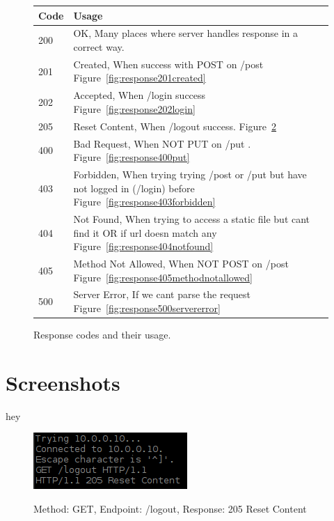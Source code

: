 \documentclass[a4paper,12pt]{article} %
\begin{document}
{\begin{figure}[H]
  \begin{tabular}{ | l | l | }
    \hline			
    Code & Usage \\
    \hline			
    200 & OK, Many places where server handles response in a correct way. \\
    \hline			
    201 & Created, When success with POST on /post Figure~\ref{fig:response201created} \\
    \hline			
    202 & Accepted, When /login success Figure~\ref{fig:response202login} \\
    \hline			
    205 & Reset Content, When /logout success. Figure~\ref{fig:response205logout} \\
    \hline			
    400 & Bad Request, When NOT PUT on /put . Figure~\ref{fig:response400put} \\
    \hline			
    403 & Forbidden, When trying trying /post or /put but have not logged in (/login) before Figure~\ref{fig:response403forbidden} \\
    \hline			
    404 & Not Found, When trying to access a static file but cant find it OR if url doesn match any Figure~\ref{fig:response404notfound} \\
    \hline			
    405 & Method Not Allowed, When NOT POST on /post Figure~\ref{fig:response405methodnotallowed} \\
    \hline			
    500 & Server Error, If we cant parse the request Figure~\ref{fig:response500servererror} \\
    \hline  
  \end{tabular}
  \label{fig:responsecodesandusage}
  \caption{Response codes and their usage.}
\end{figure}

\section{Screenshots}

hey 

\begin{figure}[H]
    \centering  
    \includegraphics[scale=1]{img/screenshots/response205logout.png}
	\label{fig:response205logout}
	\caption{Method: GET, Endpoint: /logout, Response: 205 Reset Content}
\end{figure}

}
\end{document}

